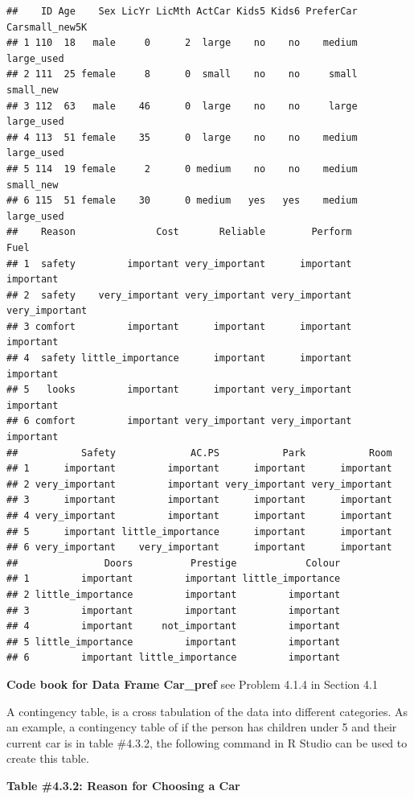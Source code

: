 \documentclass[
]{book}
\begin{document}
\begin{verbatim}
##    ID Age    Sex LicYr LicMth ActCar Kids5 Kids6 PreferCar Carsmall_new5K
## 1 110  18   male     0      2  large    no    no    medium     large_used
## 2 111  25 female     8      0  small    no    no     small      small_new
## 3 112  63   male    46      0  large    no    no     large     large_used
## 4 113  51 female    35      0  large    no    no    medium     large_used
## 5 114  19 female     2      0 medium    no    no    medium      small_new
## 6 115  51 female    30      0 medium   yes   yes    medium     large_used
##    Reason              Cost       Reliable        Perform           Fuel
## 1  safety         important very_important      important      important
## 2  safety    very_important very_important very_important very_important
## 3 comfort         important      important      important      important
## 4  safety little_importance      important      important      important
## 5   looks         important      important very_important      important
## 6 comfort         important very_important very_important      important
##           Safety             AC.PS           Park           Room
## 1      important         important      important      important
## 2 very_important         important very_important very_important
## 3      important         important      important      important
## 4 very_important         important      important      important
## 5      important little_importance      important      important
## 6 very_important    very_important      important      important
##               Doors          Prestige            Colour
## 1         important         important little_importance
## 2 little_importance         important         important
## 3         important         important         important
## 4         important     not_important         important
## 5 little_importance         important         important
## 6         important little_importance         important
\end{verbatim}

\textbf{Code book for Data Frame Car\_pref} see Problem 4.1.4 in Section 4.1

A contingency table, is a cross tabulation of the data into different categories. As an example, a contingency table of if the person has children under 5 and their current car is in table \#4.3.2, the following command in R Studio can be used to create this table.

\textbf{Table \#4.3.2: Reason for Choosing a Car}
\end{document}
